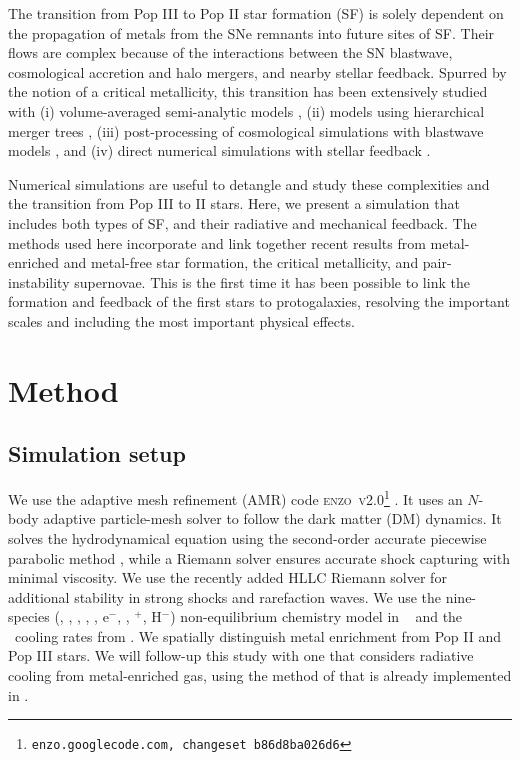 \documentclass[apjl]{emulateapj}
\begin{document}
The transition from Pop III to Pop II star formation (SF) is solely
dependent on the propagation of metals from the SNe remnants into
future sites of SF.  Their flows are complex because of the
interactions between the SN blastwave, cosmological accretion and halo
mergers, and nearby stellar feedback.  Spurred by the notion of a
critical metallicity, this transition has been extensively studied
with (i) volume-averaged semi-analytic models \citep{Scannapieco03,
  Yoshida04, Furlanetto05_Reion}, (ii) models using hierarchical
merger trees \citep{Tumlinson06, Tumlinson10, Salvadori07, Komiya10},
(iii) post-processing of cosmological simulations with blastwave
models \citep{Karlsson08, Trenti09, Trenti10}, and (iv) direct
numerical simulations with stellar feedback \citep{Tornatore07,
  Ricotti08, Maio10_Pop32, Maio10_Enrich}.

Numerical simulations are useful to detangle and study these
complexities and the transition from Pop III to II stars.  Here, we
present a simulation that includes both types of SF, and their
radiative and mechanical feedback.  The methods used here incorporate
and link together recent results from metal-enriched and metal-free
star formation, the critical metallicity, and pair-instability
supernovae.  This is the first time it has been possible to link the
formation and feedback of the first stars to protogalaxies, resolving
the important scales and including the most important physical
effects.

\section{Method}
\label{sec:setup}

\subsection{Simulation setup}

We use the adaptive mesh refinement (AMR) code
\textsc{enzo~v2.0}\footnote{\texttt{enzo.googlecode.com, changeset
    b86d8ba026d6}} \citep{OShea2004}.  It uses an $N$-body adaptive
particle-mesh solver \citep{Efstathiou85} to follow the dark matter
(DM) dynamics.  It solves the hydrodynamical equation using the
second-order accurate piecewise parabolic method \citep{Woodward84,
  Bryan95}, while a Riemann solver ensures accurate shock capturing
with minimal viscosity.  We use the recently added HLLC Riemann solver
\citep{Toro94_HLLC} for additional stability in strong shocks and
rarefaction waves.  We use the nine-species (, ,
, , , e$^-$, \hh, \hh$^+$, H$^-$)
non-equilibrium chemistry model in \enzo~\citep{Abel97, Anninos97} and
the \hh~cooling rates from \citet{Glover08_Rates}.  We spatially
distinguish metal enrichment from Pop II and Pop III stars.  We will
follow-up this study with one that considers radiative cooling from
metal-enriched gas, using the method of \citet{2008MNRAS.385.1443S}
that is already implemented in \enzo.
\end{document}
